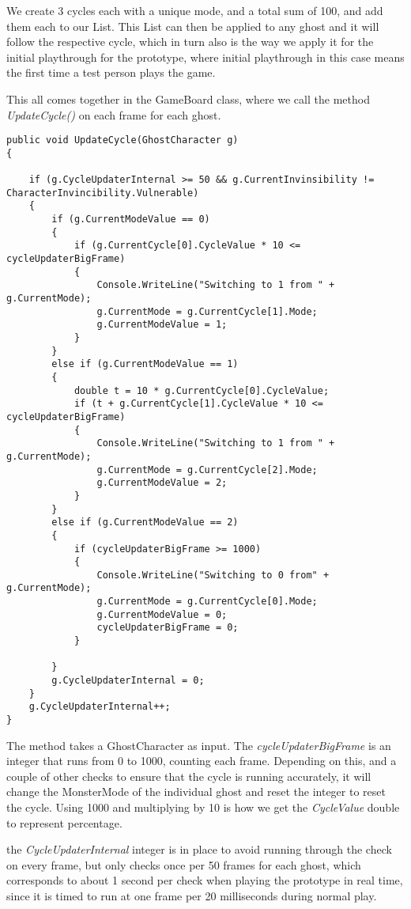 We create 3 cycles each with a unique mode, and a total sum of 100, and add them each to our List. This List can then be applied to any ghost and it will follow the respective cycle, which in turn also is the way we apply it for the initial playthrough for the prototype, where initial playthrough in this case means the first time a test person plays the game.

This all comes together in the GameBoard class, where we call the method \emph{UpdateCycle()} on each frame for each ghost.

\begin{lstlisting}[caption=Snippet of GameBoard.cs showing the system to Cycle between modes for ghosts, label=lst:cycleModes]
public void UpdateCycle(GhostCharacter g)
{

	if (g.CycleUpdaterInternal >= 50 && g.CurrentInvinsibility != CharacterInvincibility.Vulnerable)
	{
		if (g.CurrentModeValue == 0)
		{
			if (g.CurrentCycle[0].CycleValue * 10 <= cycleUpdaterBigFrame)
			{
				Console.WriteLine("Switching to 1 from " + g.CurrentMode);
				g.CurrentMode = g.CurrentCycle[1].Mode;
				g.CurrentModeValue = 1;
			}
		}
		else if (g.CurrentModeValue == 1)
		{
			double t = 10 * g.CurrentCycle[0].CycleValue;
			if (t + g.CurrentCycle[1].CycleValue * 10 <= cycleUpdaterBigFrame)
			{
				Console.WriteLine("Switching to 1 from " + g.CurrentMode);
				g.CurrentMode = g.CurrentCycle[2].Mode;
				g.CurrentModeValue = 2;
			}
		}
		else if (g.CurrentModeValue == 2)
		{
			if (cycleUpdaterBigFrame >= 1000)
			{
				Console.WriteLine("Switching to 0 from" + g.CurrentMode);
				g.CurrentMode = g.CurrentCycle[0].Mode;
				g.CurrentModeValue = 0;
				cycleUpdaterBigFrame = 0;
			}

		}
		g.CycleUpdaterInternal = 0;
	}
	g.CycleUpdaterInternal++;
}
\end{lstlisting}

The method takes a GhostCharacter as input. The \emph{cycleUpdaterBigFrame} is an integer that runs from 0 to 1000, counting each frame. Depending on this, and a couple of other checks to ensure that the cycle is running accurately, it will change the MonsterMode of the individual ghost and reset the integer to reset the cycle. Using 1000 and multiplying by 10 is how we get the \emph{CycleValue} double to represent percentage.

the \emph{CycleUpdaterInternal} integer is in place to avoid running through the check on every frame, but only checks once per 50 frames for each ghost, which corresponds to about 1 second per check when playing the prototype in real time, since it is timed to run at one frame per 20 milliseconds during normal play.

